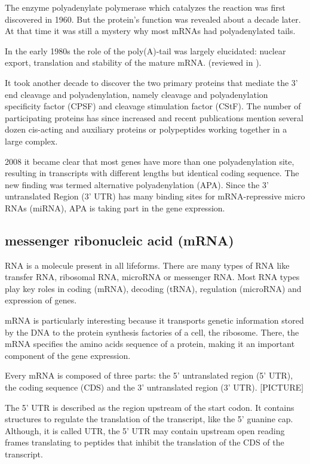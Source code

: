 The enzyme polyadenylate polymerase which catalyzes the reaction was first discovered in 1960. \cite{pmid13819354} But the protein's function was revealed about a decade later. \cite{pmid5288383} At that time it was still a mystery why most mRNAs had polyadenylated tails. 

In the early 1980s the role of the poly(A)-tail was largely elucidated: nuclear export, translation and stability of the mature mRNA. (reviewed in \cite{pmid6111419}). 

It took another decade to discover the two primary proteins that mediate the 3' end cleavage and polyadenylation, namely cleavage and polyadenylation specificity factor (CPSF) and cleavage stimulation factor (CStF). The number of participating proteins has since increased and recent publications mention several dozen cis-acting and auxiliary proteins or polypeptides working together in a large complex. \cite{pmid23774734} 

2008 it became clear that most genes have more than one polyadenylation site, resulting in transcripts with different lengths but identical coding sequence. \cite{pmid18411206} The new finding was termed alternative polyadenylation (APA). Since the 3' untranslated Region (3' UTR) has many binding sites for mRNA-repressive micro RNAs (miRNA), APA is taking part in the gene expression. \cite{pmid18566288}
\subsection{messenger ribonucleic acid (mRNA)}
RNA is a molecule present in all lifeforms. There are many types of RNA like transfer RNA, ribosomal RNA, microRNA or messenger RNA. Most RNA types play key roles in coding (mRNA), decoding (tRNA), regulation (microRNA) and expression of genes.

mRNA is particularly interesting because it transports genetic information stored by the DNA to the protein synthesis factories of a cell, the ribosome. There, the mRNA specifies the amino acids sequence of a protein, making it an important component of the gene expression.

Every mRNA is composed of three parts: the 5' untranslated region (5' UTR), the coding sequence (CDS) and the 3' untranslated region (3' UTR). [PICTURE] 

The 5' UTR is described as the region upstream of the start codon. It contains structures to regulate the translation of the transcript, like the 5' guanine cap. Although, it is called UTR, the 5' UTR may contain upstream open reading frames translating to peptides that inhibit the translation of the CDS of the transcript.

